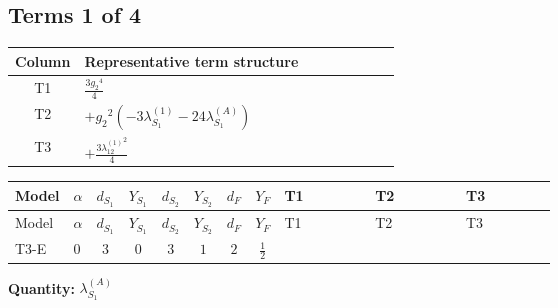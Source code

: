\documentclass[8pt]{article}
\begin{document}
\begin{landscape}
\subsection*{Terms 1 of 4}
\begin{center}
\begin{tabular}{@{}c >{\raggedright\arraybackslash}p{0.82\linewidth}@{}}
\toprule
Column & Representative term structure \\
\midrule
T1 & \(\displaystyle \frac{3 {g_2}^4}{4}\) \\
\midrule
T2 & \(\displaystyle +{g_2}^2 (-3 {\lambda_{S_1}^{(1)}}-24 {\lambda_{S_1}^{(A)}})\) \\
\midrule
T3 & \(\displaystyle +\frac{3 {\lambda_{12}^{(1)}}^2}{4}\) \\
\midrule
\bottomrule
\end{tabular}
\end{center}
\smallskip
\tiny
\begin{longtable}{@{}llcccccc >{\raggedright\arraybackslash}p{0.21\linewidth} >{\raggedright\arraybackslash}p{0.21\linewidth} >{\raggedright\arraybackslash}p{0.21\linewidth}@{}}
\toprule
Model & $\alpha$ & $d_{S_1}$ & $Y_{S_1}$ & $d_{S_2}$ & $Y_{S_2}$ & $d_F$ & $Y_F$ & T1 & T2 & T3 \\
\midrule
\endfirsthead
\toprule
Model & $\alpha$ & $d_{S_1}$ & $Y_{S_1}$ & $d_{S_2}$ & $Y_{S_2}$ & $d_F$ & $Y_F$ & T1 & T2 & T3 \\
\midrule
\endhead
T3-E & $0$ & $3$ & $0$ & $3$ & $1$ & $2$ & $\frac{1}{2}$ & \scriptsize\adjustbox{max width=\linewidth}{$\begin{gathered} \frac{3 {g_2}^4}{4}\end{gathered}$} & \scriptsize\adjustbox{max width=\linewidth}{$\begin{gathered} +{g_2}^2 (-3 {\lambda_{S_1}^{(1)}}-24 {\lambda_{S_1}^{(A)}})\end{gathered}$} & \scriptsize\adjustbox{max width=\linewidth}{$\begin{gathered} +\frac{3 {\lambda_{12}^{(1)}}^2}{4}\end{gathered}$} \\
\midrule
\bottomrule
\end{longtable}
\clearpage
\noindent\textbf{Quantity: }$\lambda_{S_1}^{(A)}$\par\smallskip

\end{landscape}
\end{document}
